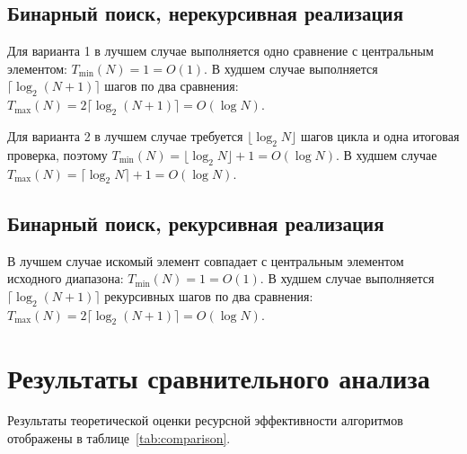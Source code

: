 \documentclass{bmstu}
\begin{document}
\subsection{Бинарный поиск, нерекурсивная реализация}
Для варианта 1 в лучшем случае выполняется одно сравнение с центральным
элементом: $T_{\min}(N)=1=O(1)$. В худшем случае выполняется
$\lceil\log_2(N+1)\rceil$ шагов по два сравнения:
$T_{\max}(N)=2\lceil\log_2(N+1)\rceil=O(\log N)$.

Для варианта 2 в лучшем случае требуется $\lfloor\log_2N\rfloor$ шагов
цикла и одна итоговая проверка, поэтому
$T_{\min}(N)=\lfloor\log_2N\rfloor+1=O(\log N)$. В худшем случае
$T_{\max}(N)=\lceil\log_2N\rceil+1=O(\log N)$.

\subsection{Бинарный поиск, рекурсивная реализация}
В лучшем случае искомый элемент совпадает с центральным элементом исходного
диапазона: $T_{\min}(N)=1=O(1)$. В худшем случае выполняется
$\lceil\log_2(N+1)\rceil$ рекурсивных шагов по два сравнения:
$T_{\max}(N)=2\lceil\log_2(N+1)\rceil=O(\log N)$.

\section{Результаты сравнительного анализа}
Результаты теоретической оценки ресурсной эффективности алгоритмов отображены в
таблице~\ref{tab:comparison}.
\end{document}
